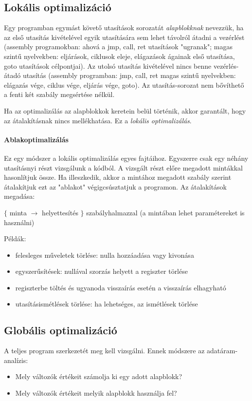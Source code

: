 \documentclass[margin=0px]{article}
\begin{document}
\subsection{Lokális optimalizáció} 
	
	Egy programban egymást követő utasítások sorozatát \textit{alapblokknak} nevezzük, ha az első utasítás kivételével egyik utasítására sem lehet távolról átadni a vezérlést (assembly programokban: ahová a jmp, call, ret utasítások "ugranak"; magas szintű nyelvekben: eljárások, ciklusok eleje, elágazások ágainak első utasítása, goto utasítások célpontjai). Az utolsó utasítás kivételével nincs benne vezérlés-átadó utasítás (assembly programban: jmp, call, ret magas szintű nyelvekben: elágazás vége, ciklus vége, eljárás vége, goto). Az utasítás-sorozat nem bővíthető a fenti két szabály megsértése nélkül.
	
	Ha az optimalizálás az alapblokkok keretein belül történik, akkor garantált, hogy az átalakításnak nincs mellékhatása. Ez a \textit{lokális optimalizálás}.
	
	\paragraph{Ablakoptimalizálás}
	Ez egy módszer a lokális optimalizálás egyes fajtáihoz. Egyszerre csak egy néhány utasításnyi részt vizsgálunk a kódból. A vizsgált részt előre megadott mintákkal hasonlítjuk össze. Ha illeszkedik, akkor a mintához megadott szabály szerint átalakítjuk ezt az "ablakot" végigcsúsztatjuk a programon. Az átalakítások megadása:
	\begin{center}
	$ \lbrace$ minta $ \rightarrow $ helyettesítés $\rbrace$ szabályhalmazzal
	(a mintában lehet paramétereket is használni)
	\end{center}

	Példák:
	\begin{itemize}
		\item 
		felesleges műveletek törlése: nulla hozzáadása vagy kivonása
		\item 
		egyszerűsítések: nullával szorzás helyett a regiszter törlése
		\item 
		regiszterbe töltés és ugyanoda visszaírás esetén a visszaírás elhagyható
		\item 
		utasításismétlések törlése: ha lehetséges, az ismétlések törlése
	\end{itemize}
	

\subsection{Globális optimalizáció} 
	A teljes program szerkezetét meg kell vizsgálni. Ennek módszere az adatáram-analízis:
	\begin{itemize}
		\item 
		Mely változók értékeit számolja ki egy adott alapblokk?
		\item 
		Mely változók értékeit melyik alapblokk használja fel?
	\end{itemize}
	
\end{document}
